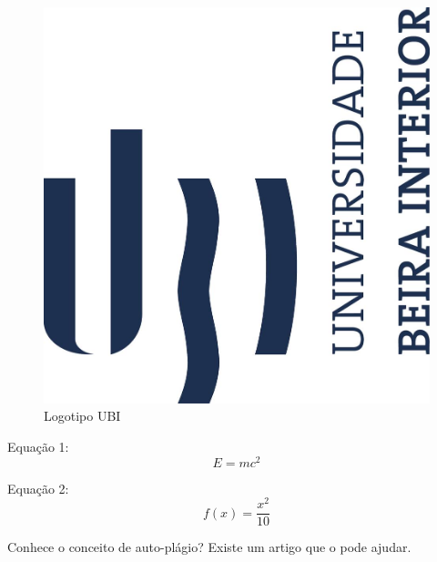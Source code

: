 \documentclass[a4paper,12pt]{report}
\begin{document}
  \listoffigures
  \begin{figure}
      \centering
      \includegraphics[scale=0.3]{../Images/logo_ubi_vprincipal.jpg}
      \caption{Logotipo UBI}
  \end{figure} 
  
  Equação 1:
  \begin{equation}
    E=mc^2
  \end{equation}
  
  Equação 2:
  \[f(x)=\frac{x^2}{10}\]
  
  Conhece o conceito de auto-plágio? Existe um artigo \cite{self-plagiarism} que o pode ajudar.
  
  
\end{document}
